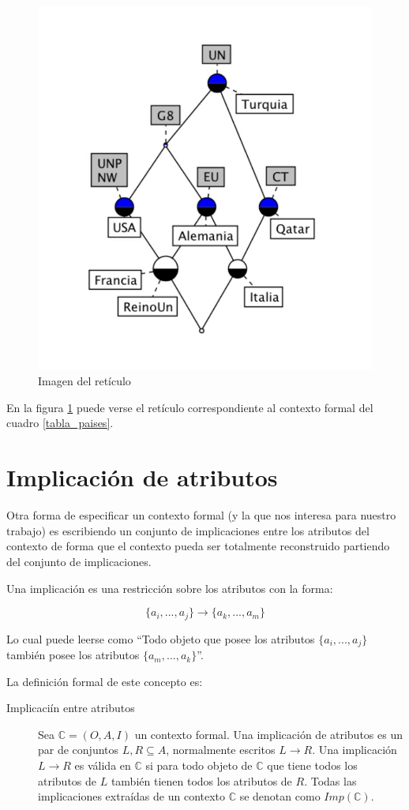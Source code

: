 	\begin{figure}
		\centering
		\includegraphics[width=0.5\linewidth]{02_FCA/reticulo}
		\caption{Imagen del retículo}
		\label{reticulo}
	\end{figure}

	En la figura \ref{reticulo} puede verse el retículo correspondiente al contexto formal del cuadro \ref{tabla_paises}.
	
	
	
\section*{Implicación de atributos}

	Otra forma de especificar un contexto formal (y la que nos interesa para nuestro trabajo) es escribiendo un conjunto de implicaciones entre los atributos del contexto de forma que el contexto pueda ser totalmente reconstruido partiendo del conjunto de implicaciones.
	
	Una implicación es una restricción sobre los atributos con la forma: 
	
	\[ \{a_i,...,a_j\} \rightarrow \{a_k,...,a_m\} \]
	
	Lo cual puede leerse como ``Todo objeto que posee los atributos $\{a_i,...,a_j\}$ también posee los atributos $\{a_m,...,a_k\}$''.
	
	La definición formal de este concepto es: 
	
	\begin{description}
		\item[Implicaciín entre atributos] Sea $\mathbb{C} = (O,A,I)$ un contexto formal. Una implicación de atributos es un par de conjuntos $L, R \subseteq A$, normalmente escritos $L \rightarrow R$. Una implicación $L \rightarrow R$ es válida en $\mathbb{C}$ si para todo objeto de $\mathbb{C}$ que tiene todos los atributos de $L$ también tienen todos los atributos de $R$. Todas las implicaciones extraídas de un contexto $\mathbb{C}$ se denotan como $Imp(\mathbb{C})$.
	\end{description}
	
